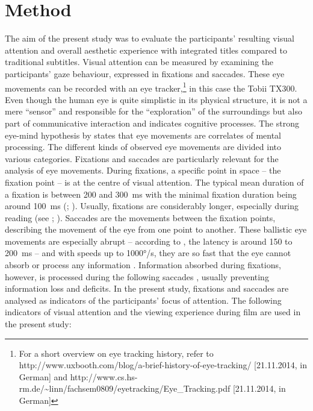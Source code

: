 \documentclass[output=paper]{langsci/langscibook}
\begin{document}
\section{Method}

The aim of the present study was to evaluate the participants' resulting visual attention and overall aesthetic experience with integrated titles compared to traditional subtitles. Visual attention can be measured by examining the participants' gaze behaviour, expressed in fixations and saccades. These eye movements can be recorded with an eye tracker,\footnote{For a short overview on eye tracking history, refer to http://www.uxbooth.com/blog/a-brief-history-of-eye-tracking/ [21.11.2014, in German] and http://www.cs.hs-rm.de/\~{}linn/fachsem0809/eyetracking/Eye\_Tracking.pdf [21.11.2014, in German]} in this case the Tobii TX300. Even though the human eye is quite simplistic in its physical structure, it is not a mere ``sensor'' \citep[1]{Joos2002} and responsible for the ``exploration'' of the surroundings but also part of communicative interaction and indicates cognitive processes. The strong eye-mind hypothesis by \citet{justcarpenter1980} states that eye movements are correlates of mental processing. The different kinds of observed eye movements are divided into various categories. Fixations and saccades are particularly relevant for the analysis of eye movements. During fixations, a specific point in space -- the fixation point -- is at the centre of visual attention. The typical mean duration of a fixation is between 200 and 300~ms with the minimal fixation duration being around 100~ms (\citealt[373]{rayner1998}; \citealt[2]{flothow2009}). Usually, fixations are considerably longer, especially during reading (see \citealt{rayner1998}; \citealt{jakobsen2008}). Saccades are the movements between the fixation points, describing the movement of the eye from one point to another. These ballistic eye movements are especially abrupt -- according to \citet[17]{joos2005}, the latency is around 150 to 200~ms -- and with speeds up to 1000°/s, they are so fast that the eye cannot absorb or process any information \citep[4]{flothow2009}. Information absorbed during fixations, however, is processed during the following saccades \citep[6]{kowler2006}, usually preventing information loss and deficits. In the present study, fixations and saccades are analysed as indicators of the participants' focus of attention. The following indicators of visual attention and the viewing experience during film are used in the present study:
\end{document}
